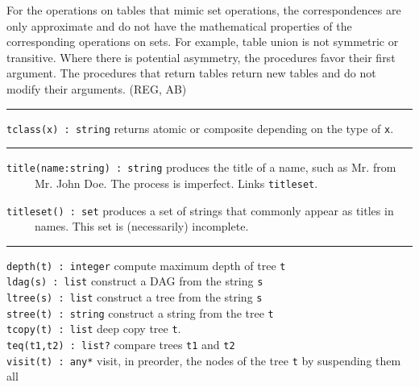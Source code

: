 For the operations on tables that mimic set operations, the
correspondences are only approximate and do not have the mathematical
properties of the corresponding operations on sets. For example, table
{\textquotedbl}union{\textquotedbl} is not symmetric or transitive.
Where there is potential asymmetry, the procedures
{\textquotedbl}favor{\textquotedbl} their first argument. The
procedures that return tables return new tables and do not modify their
arguments. (REG, AB)

\vspace{0.25cm}\hrule{}

\texttt{tclass(x) : string} returns {\textquotedbl}atomic{\textquotedbl}
or {\textquotedbl}composite{\textquotedbl} depending on the type of
\texttt{x}. 

\vspace{0.25cm}\hrule{}

\texttt{title(name:string) : string} produces the title of a name, such
as {\textquotedbl}Mr.{\textquotedbl} from\\
 \ \ \ \ \ {\textquotedbl}Mr. John Doe{\textquotedbl}. The process is
imperfect. Links \texttt{titleset}.

\texttt{titleset() : set} produces a set of strings that commonly appear
as titles in\\
 \ \ \ \ \ names. This set is (necessarily) incomplete. 

\vspace{0.25cm}\hrule{}

\texttt{depth(t) : integer} compute maximum depth of tree
\texttt{t}\\
\texttt{ldag(s) : list} construct a DAG from the string
\texttt{s}\\
\texttt{ltree(s) : list} construct a tree from the string
\texttt{s}\\
\texttt{stree(t) : string} construct a string from the tree
\texttt{t}\\
\texttt{tcopy(t) : list} deep copy tree \texttt{t}.\\
\texttt{teq(t1,t2) : list?} compare trees \texttt{t1} and
\texttt{t2}\\
\texttt{visit(t) : any*} visit, in preorder, the nodes of the tree
\texttt{t} by suspending them all 

